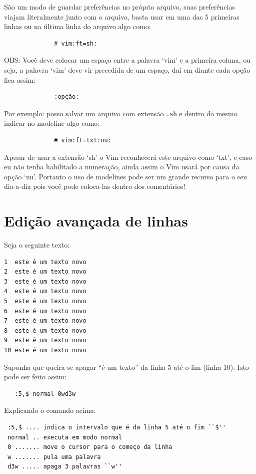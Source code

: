\documentclass[10pt,a4paper,openany]{book}
\begin{document}
São um modo de guardar preferências no próprio arquivo, suas
preferências viajam literalmente junto com o arquivo, basta usar em
uma das 5 primeiras linhas ou na última linha do arquivo algo
como:

\begin{verbatim}
			  # vim:ft=sh:
\end{verbatim}

OBS: Você deve colocar um espaço entre a palavra `vim' e a primeira
coluna, ou seja, a palavra `vim' deve vir precedida de um espaço, daí
em diante cada opção fica assim:

\begin{verbatim}
			  :opção:
\end{verbatim}

Por exemplo: posso salvar um arquivo com extensão \verb|.sh| e dentro do
mesmo indicar no modeline algo como:

\begin{verbatim}
			  # vim:ft=txt:nu:
\end{verbatim}

Apesar de usar a extensão `sh' o Vim reconhecerá este arquivo como `txt', e
caso eu não tenha habilitado a numeração, ainda assim o Vim usará por causa da
opção `nu'.  Portanto o uso de modelines  pode ser um grande recurso para o seu
dia-a-dia pois você pode coloca-las dentro dos comentários!

\section{Edição avançada de linhas}

Seja o seguinte texto:

\begin{verbatim}
1  este é um texto novo
2  este é um texto novo
3  este é um texto novo
4  este é um texto novo
5  este é um texto novo
6  este é um texto novo
7  este é um texto novo
8  este é um texto novo
9  este é um texto novo
10 este é um texto novo
\end{verbatim}

Suponha que queira-se apagar ``é um texto'' da linha 5 até o fim (linha 10). Isto pode ser feito
assim: 

\begin{verbatim}
   :5,$ normal 0wd3w
\end{verbatim}

Explicando o comando acima:

\begin{verbatim}
 :5,$ .... indica o intervalo que é da linha 5 até o fim ``$''
 normal .. executa em modo normal
 0 ....... move o cursor para o começo da linha
 w ....... pula uma palavra
 d3w ..... apaga 3 palavras ``w''
\end{verbatim}
\end{document}
